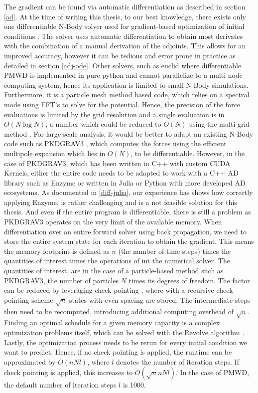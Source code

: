 \documentclass{article}
\begin{document}
The gradient can be found via automatic differentiation as described in section \ref{ad}. At the time of writing this thesis, to our best knowledge, there exists only one differentiable N-Body solver used for gradient-based optimization of initial conditions \citep{li2024differentiable}. The solver uses automatic differentiation to obtain most derivates with the combination of a manual derivation of the adjoints. This allows for an improved accuracy, however it can be tedious and error prone in practice as detailed in section \ref{adj-ode}.  Other solvers, such as euclid where differentiable PMWD is implemented in pure python and cannot parallelize to a multi node computing system, hence its application is limited to small N-Body simulations. Furthermore, it is a particle mesh method based code, which relies on a spectral mode using FFT's to solve for the potential. Hence, the precision of the force evaluations is limited by the grid resolution and a single evaluation is in $O(N \log N)$, a number which could be reduced to $O(N)$ using the multi-grid method \citep{mccormick1987multigrid}. For large-scale analysis, it would be better to adapt an existing N-Body code such as PKDGRAV3 \citep{potter2017pkdgrav3}, which computes the forces using the efficient multipole expansion which lies in $O(N)$, to be  differentiable. However, in the case of PKDGRAV3, which has been written in C++ with custom CUDA Kernels, either the entire code needs to be adapted to work with a C++ AD library such as Enzyme or written in Julia or Python with more developed AD ecosystems. As documented in \ref{diff-julia}, our experience has shows how correctly applying Enzyme, is rather challenging and is a not feasible solution for this thesis. And even if the entire program is differentiable, there is still a problem as PKDGRAV3 operates on the very limit of the available memory. When differentiation over an entire forward solver using back propagation, we need to store the entire system state for each iteration to obtain the gradient. This means the memory footprint is defined as $n$ (the number of time steps) times the quantities of interest times the operations of int the numerical solver. The quantities of interest, are in the case of a particle-based method such as PKDGRAV3, the number of particles $N$ times its degrees of freedom. The factor can be reduced by leveraging check pointing \citep{wang2009minimal}, where with a recursive check-pointing scheme $\sqrt n$ states with even spacing are stored. The intermediate steps then need to be recomputed, introducing additional computing overhead of  $\sqrt n$. Finding an optimal schedule for a given memory capacity is a complex optimization problems itself, which can be solved with the Revolve algorithm \citep{griewank2000algorithm}. Lastly, the optimization process needs to be rerun for every initial condition we want to predict. Hence, if no check pointing is applied, the runtime can be approximated by $O(n N l)$, where $l$ denotes the number of iteration steps. If check pointing is applied, this increases to $O(\sqrt{n} n N l)$. In the case of PMWD, the default number of iteration steps $l$ is 1000.
\end{document}
